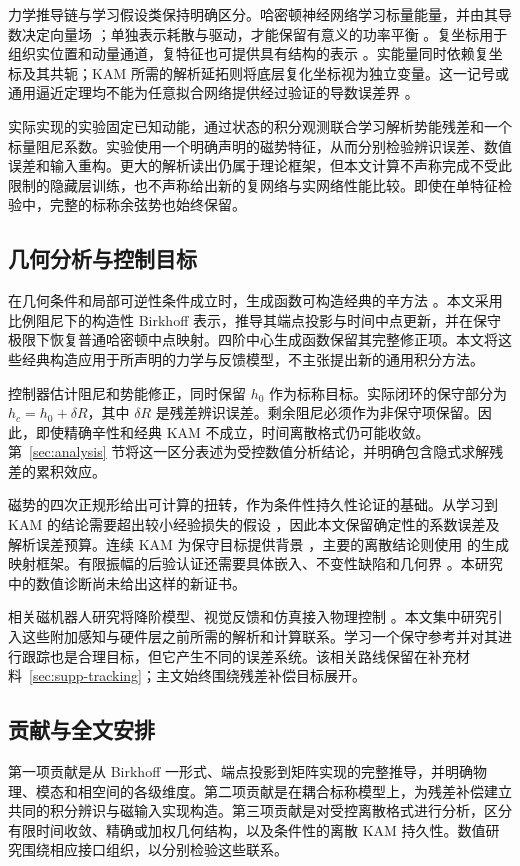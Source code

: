 力学推导链与学习假设类保持明确区分。哈密顿神经网络学习标量能量，并由其导数决定向量场 \citep{greydanus}；单独表示耗散与驱动，才能保留有意义的功率平衡 \citep{zhong,desai}。复坐标用于组织实位置和动量通道，复特征也可提供具有结构的表示 \citep{trabelsi}。实能量同时依赖复坐标及其共轭；KAM 所需的解析延拓则将底层复化坐标视为独立变量。这一记号或通用逼近定理均不能为任意拟合网络提供经过验证的导数误差界 \citep{hornik,zhang}。

实际实现的实验固定已知动能，通过状态的积分观测联合学习解析势能残差和一个标量阻尼系数。实验使用一个明确声明的磁势特征，从而分别检验辨识误差、数值误差和输入重构。更大的解析读出仍属于理论框架，但本文计算不声称完成不受此限制的隐藏层训练，也不声称给出新的复网络与实网络性能比较。即使在单特征检验中，完整的标称余弦势也始终保留。

\subsection{几何分析与控制目标}
在几何条件和局部可逆性条件成立时，生成函数可构造经典的辛方法 \citep{feng,fengqin,hairer}。本文采用比例阻尼下的构造性 Birkhoff 表示，推导其端点投影与时间中点更新，并在保守极限下恢复普通哈密顿中点映射。四阶中心生成函数保留其完整修正项。本文将这些经典构造应用于所声明的力学与反馈模型，不主张提出新的通用积分方法。

控制器估计阻尼和势能修正，同时保留 $h_0$ 作为标称目标。实际闭环的保守部分为 $h_c=h_0+\delta R$，其中 $\delta R$ 是残差辨识误差。剩余阻尼必须作为非保守项保留。因此，即使精确辛性和经典 KAM 不成立，时间离散格式仍可能收敛。第~\ref{sec:analysis} 节将这一区分表述为受控数值分析结论，并明确包含隐式求解残差的累积效应。

磁势的四次正规形给出可计算的扭转，作为条件性持久性论证的基础。从学习到 KAM 的结论需要超出较小经验损失的假设 \citep{chen2022}，因此本文保留确定性的系数误差及解析误差预算。连续 KAM 为保守目标提供背景 \citep{poschel}，主要的离散结论则使用 \citet{shang} 的生成映射框架。有限振幅的后验认证还需要具体嵌入、不变性缺陷和几何界 \citep{haro2019aposteriori}。本研究中的数值诊断尚未给出这样的新证书。

相关磁机器人研究将降阶模型、视觉反馈和仿真接入物理控制 \citep{francescon2025shape,tong2025navigation}。本文集中研究引入这些附加感知与硬件层之前所需的解析和计算联系。学习一个保守参考并对其进行跟踪也是合理目标，但它产生不同的误差系统。该相关路线保留在补充材料~\ref{sec:supp-tracking}；主文始终围绕残差补偿目标展开。

\subsection{贡献与全文安排}
第一项贡献是从 Birkhoff 一形式、端点投影到矩阵实现的完整推导，并明确物理、模态和相空间的各级维度。第二项贡献是在耦合标称模型上，为残差补偿建立共同的积分辨识与磁输入实现构造。第三项贡献是对受控离散格式进行分析，区分有限时间收敛、精确或加权几何结构，以及条件性的离散 KAM 持久性。数值研究围绕相应接口组织，以分别检验这些联系。

